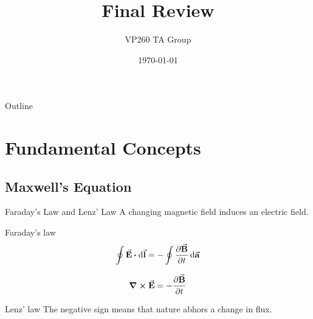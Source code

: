 \documentclass{beamer}
\title[VP260 RC]{Final Review} %
\author{VP260 TA Group} %
\institute[UM-SJTU JI] %
{
    University of Michigan - Shanghai Jiao Tong University Joint Institute\\%
\medskip
}
\date{\today} %
\begin{document}
\begin{frame}
    \titlepage %
\end{frame}

\begin{frame}{Outline}
    \tableofcontents
\end{frame}

\section{Fundamental Concepts}

\subsection{Maxwell's Equation} %

\begin{frame}{Faraday’s Law and Lenz' Law}
    A changing magnetic field induces an electric field.

    \begin{block}{Faraday's law}
        \begin{equation}
            \oint \va{E} \vdot \dd{\va{l}} = -\oint \pdv{\va{B}}{t} \dd{\va{a}}
        \end{equation}

        \begin{equation}
            \curl{\va{E}} = -\pdv{\va{B}}{t}
        \end{equation}
    \end{block}

    \begin{block}{Lenz' law}
        The negative sign means that nature abhors a change in flux.
    \end{block}
\end{frame}
\end{document}

